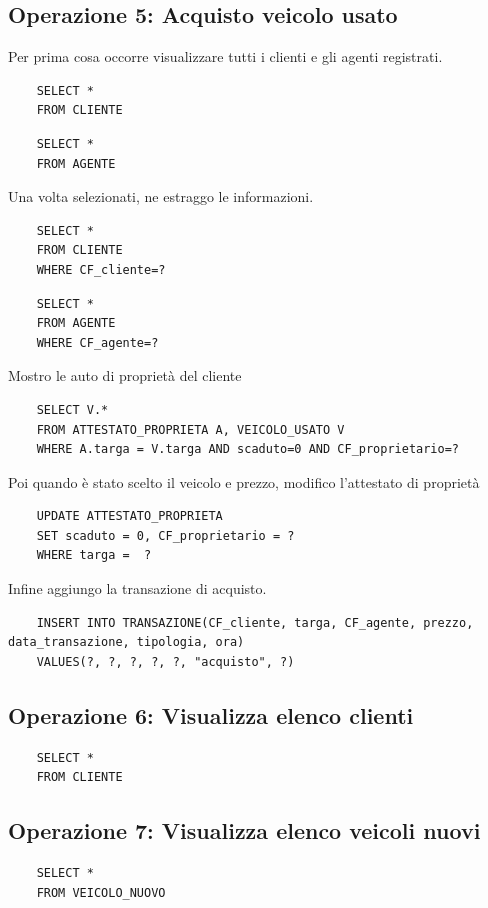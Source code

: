 \documentclass[a4paper,12pt]{report}
\begin{document}
\subsection*{Operazione 5: Acquisto veicolo usato}
Per prima cosa occorre visualizzare tutti i clienti e gli agenti registrati.
\begin{lstlisting}
	SELECT * 
	FROM CLIENTE
\end{lstlisting}
\begin{lstlisting}
	SELECT * 
	FROM AGENTE
\end{lstlisting}
Una volta selezionati, ne estraggo le informazioni.
\begin{lstlisting}
	SELECT * 
	FROM CLIENTE
	WHERE CF_cliente=?
\end{lstlisting}
\begin{lstlisting}
	SELECT * 
	FROM AGENTE
	WHERE CF_agente=?
\end{lstlisting}
Mostro le auto di proprietà del cliente
\begin{lstlisting}
	SELECT V.* 
	FROM ATTESTATO_PROPRIETA A, VEICOLO_USATO V 
	WHERE A.targa = V.targa AND scaduto=0 AND CF_proprietario=?
\end{lstlisting}
Poi quando è stato scelto il veicolo e prezzo, modifico l'attestato di proprietà
\begin{lstlisting}
	UPDATE ATTESTATO_PROPRIETA
	SET scaduto = 0, CF_proprietario = ?
    WHERE targa =  ? 
\end{lstlisting}
Infine aggiungo la transazione di acquisto.
\begin{lstlisting}
	INSERT INTO TRANSAZIONE(CF_cliente, targa, CF_agente, prezzo, data_transazione, tipologia, ora) 
	VALUES(?, ?, ?, ?, ?, "acquisto", ?)
\end{lstlisting}

\subsection*{Operazione 6: Visualizza elenco clienti}
\begin{lstlisting}
	SELECT *
	FROM CLIENTE
\end{lstlisting}

\subsection*{Operazione 7: Visualizza elenco veicoli nuovi}
\begin{lstlisting}
	SELECT *
	FROM VEICOLO_NUOVO
\end{lstlisting}
\end{document}
